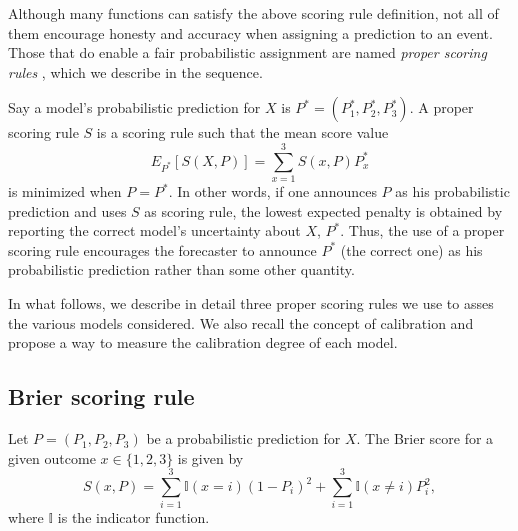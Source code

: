 \documentclass[journal,article,accept,moreauthors,pdftex,12pt,a4paper]{mdpi}
\begin{document}
    Although many functions can satisfy the above scoring rule definition, not all of them encourage honesty and accuracy when assigning a prediction to an event. Those that do enable a fair probabilistic assignment are named \emph{proper scoring rules} \cite{lad}, which we describe in the sequence.

    Say a model's probabilistic prediction for $X$ is $P^*=(P_1^*,P_2^*,P_3^*).$ A proper scoring rule $S$ is a scoring rule  such that the mean score value
    $$E_{P^*}[S(X,P)]=\sum_{x=1}^3 S(x,P)P^*_x$$
     is minimized when $P=P^*$.
    In other words, if one announces
    $P$ as his probabilistic prediction
    and uses $S$ as scoring rule, the lowest
    expected penalty is obtained by reporting the correct model's  uncertainty about $X$, $P^*$.
    Thus, the use of a proper scoring rule encourages the forecaster to announce $P^*$ (the correct one)
    as his probabilistic prediction  rather than some other quantity.

    In what follows, we describe in detail three proper scoring rules we use to asses the various models considered.
    We also recall the concept of calibration and propose a way to measure the calibration degree of each model.




    \subsection{Brier scoring rule}

    Let $P=(P_1,P_2,P_3)$ be a probabilistic prediction  for $X$.
    The Brier score for a given outcome $x\in\{1,2,3\}$ is given by
    $$S(x,P)= \sum_{i=1}^3\mathbb{I}(x=i)(1- P_i)^2+\sum_{i=1}^3\mathbb{I}(x\neq i)P^2_i,$$
    where $\mathbb{I}$ is the indicator function.
\end{document}
